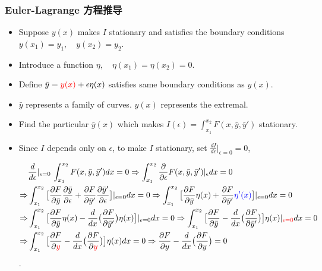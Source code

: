 \documentclass[UTF8, aspectratio=169, 10pt]{ctexbeamer}
\begin{document}
\begin{frame}
  \frametitle{Euler-Lagrange 方程推导}
  \begin{itemize}
  \item Suppose $y(x)$ makes $I$ stationary and satisfies the boundary
    conditions $y(x_1) = y_1, \quad y(x_2) = y_2$.
  \item Introduce a function $\eta, \quad \eta (x_1) = \eta (x_2) = 0$.
  \item Define $\bar{y} = \textcolor{red} {y(x)} + \epsilon \eta(x)$ satisfies same boundary
    conditions as $y(x)$.
  \item $\bar{y}$ represents a family of curves. $ y(x) $ represents the extremal.
  \item Find the particular $\bar{y} (x)$ which makes $I( \epsilon ) =
    \int_{x_1}^{x_2} F( x, \bar{y}, \bar{y}' )$ stationary.
  \item Since $I$ depends only on $\epsilon$, to make $I$ stationary, set
    $\frac{dI}{d \epsilon} |_{\epsilon = 0} = 0$,

    \begin{align}
      \begin{split}
        & \frac{d}{d \epsilon} |_{\epsilon = 0} \, \int_{x_1}^{x_2} F(x,
        \bar{y}, \bar{y}' ) dx = 0 \Rightarrow \int_{x_1}^{x_2}
        \frac{\partial}{\partial
          \epsilon} F( x, \bar{y}, \bar{y}' ) |_{\epsilon} dx = 0 \\
        \Rightarrow & \int_{x_1}^{x_2} \big [ \frac{ \partial F }{ \partial
          \bar{y} } \frac{ \partial \bar{y} }{ \partial \epsilon } + \frac{
          \partial F }{ \partial \bar{y}' } \frac{ \partial \bar{y}' }{ \partial
          \epsilon } \big ] |_{\epsilon=0} dx = 0
        \Rightarrow  \int_{x_1}^{x_2} \big [ \frac{ \partial F }{ \partial
          \bar{y} } \eta (x) + \frac{
          \partial F }{ \partial \bar{y}' } \textcolor {blue} {\eta'(x)} \big ] |_{\epsilon=0} dx =
        0 \\
        \Rightarrow & \int_{x_1}^{x_2} \big [ \frac{ \partial F }{ \partial
          \bar{y} } \eta (x) - \frac{d}{dx} \big ( \frac{
          \partial F }{ \partial \bar{y}' } \big ) \eta(x) \big ] |_{\epsilon=0} dx =
        0
        \Rightarrow  \int_{x_1}^{x_2} \big [ \frac{ \partial F }{ \partial
          \bar{y} }  - \frac{d}{dx} \big ( \frac{
          \partial F }{ \partial \bar{y}' } \big )  \big ] \eta(x) |_{\textcolor
          {red} {\epsilon=0} } dx =
        0  \\
        \Rightarrow & \int_{x_1}^{x_2} \big [ \frac{ \partial F }{ \partial
          \textcolor {red} {y} }  - \frac{d}{dx} \big ( \frac{
          \partial F }{ \partial \textcolor {red} {y} } \big )  \big ] \eta(x)  dx =
        0
        \Rightarrow \frac{ \partial F }{ \partial
          {y} }  - \frac{d}{dx} \big ( \frac{
          \partial F }{ \partial  {y} } \big )  = 0
      \end{split}
    \end{align}.

  \end{itemize}
\end{frame}
\end{document}
